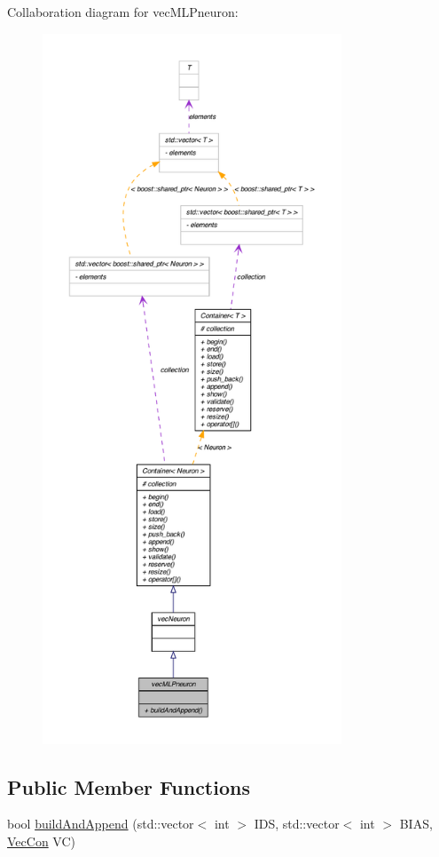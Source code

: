 Collaboration diagram for vecMLPneuron:\nopagebreak
\begin{figure}[H]
\begin{center}
\leavevmode
\includegraphics[height=600pt]{classvec_m_l_pneuron__coll__graph}
\end{center}
\end{figure}
\subsection*{Public Member Functions}
\begin{DoxyCompactItemize}
\item 
bool \hyperlink{classvec_m_l_pneuron_a2eeb007315309d793615f9c3a3ecd473}{buildAndAppend} (std::vector$<$ int $>$ IDS, std::vector$<$ int $>$ BIAS, \hyperlink{class_vec_con}{VecCon} VC)
\end{DoxyCompactItemize}


